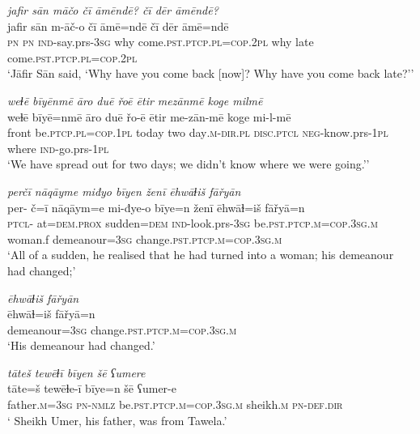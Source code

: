 \ea \label{ŠJ.43}
\textit{jafir sān māčo čī āmēndē? čī dēr āmēndē?} \\ 
\gll jafir sān m-āč-o čī āmē=ndē čī dēr āmē=ndē \\ 
 \textsc{pn} \textsc{pn} \textsc{ind-}say.prs\textsc{-3sg} why come\textsc{.pst}\textsc{.ptcp}\textsc{.pl}\textsc{=cop}.\textsc{2pl} why late come\textsc{.pst}\textsc{.ptcp}\textsc{.pl}\textsc{=cop}.\textsc{2pl} \\ 
\glt `Jāfir Sān said, ‘Why have you come back [now]? Why have you come back late?’'
\z 
 
\ea \label{ŠJ.45}
\textit{weɫē bīyēnmē āro duē řoē ētir mezānmē koge milmē} \\ 
\gll weɫē bīyē=nmē āro duē řo-ē ētir me-zān-mē koge mi-l-mē \\ 
 front be\textsc{.ptcp}\textsc{.pl}\textsc{=cop}\textsc{.\textsc{1pl}} today two day\textsc{.m}\textsc{-dir}\textsc{.pl} \textsc{disc.ptcl} \textsc{neg-}know.prs\textsc{-\textsc{1pl}} where \textsc{ind-}go.prs\textsc{-\textsc{1pl}} \\ 
\glt `We have spread out for two days; we didn’t know where we were going.’'
\z 
 
\ea \label{ŠJ.48}
\textit{perčī nāqāyme miđyo bīyen ženī ēhwāɫiš fāřyān} \\ 
\gll per- č=ī nāqāym=e mi-đye-o bīye=n ženī ēhwāɫ=iš fāřyā=n \\ 
 \textsc{ptcl}- at=\textsc{dem.prox} sudden\textsc{=dem} \textsc{ind-}look.prs\textsc{-3sg} be\textsc{.pst}\textsc{.ptcp}\textsc{.m}\textsc{=cop}\textsc{.3sg}\textsc{.m} woman.f demeanour\textsc{=3sg} change\textsc{.pst}\textsc{.ptcp}\textsc{.m}\textsc{=cop}\textsc{.3sg}\textsc{.m} \\ 
\glt `All of a sudden, he realised that he had turned into a woman; his demeanour had changed;'
\z 
 
\ea \label{ŠJ.49}
\textit{ēhwāɫiš fāřyān} \\ 
\gll ēhwāɫ=iš fāřyā=n \\ 
 demeanour\textsc{=3sg} change\textsc{.pst}\textsc{.ptcp}\textsc{.m}\textsc{=cop}\textsc{.3sg}\textsc{.m} \\ 
\glt `His demeanour had changed.'
\z 
 
\ea \label{ŠJ.57}
\textit{tāteš tewēɫī bīyen šē ʕumere} \\ 
\gll tāte=š tewēɫe-ī bīye=n šē ʕumer-e \\ 
 father\textsc{.m}\textsc{=3sg} \textsc{pn}\textsc{-nmlz} be\textsc{.pst}\textsc{.ptcp}\textsc{.m}\textsc{=cop}\textsc{.3sg}\textsc{.m} sheikh\textsc{.m} \textsc{pn}\textsc{-def}\textsc{.dir} \\ 
\glt ` Sheikh Umer, his father, was from Tawela.'
\z 
 
